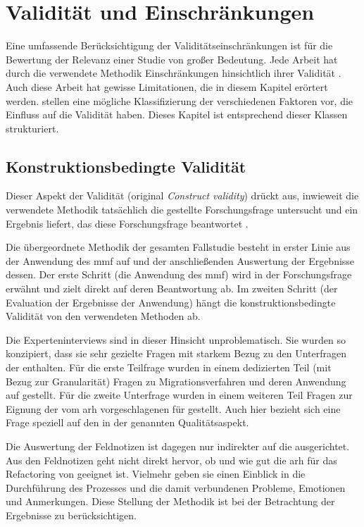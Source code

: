 \chapter{Validität und Einschränkungen}
\label{chap:gueltigkeit}

Eine umfassende Berücksichtigung der Validitätseinschränkungen ist für die Bewertung der Relevanz einer Studie von großer Bedeutung. 
Jede Arbeit hat durch die verwendete Methodik Einschränkungen hinsichtlich ihrer Validität \cite{campbell2015experimental}.
Auch diese Arbeit hat gewisse Limitationen, die in diesem Kapitel erörtert werden.
 stellen eine mögliche Klassifizierung der verschiedenen Faktoren vor, die Einfluss auf die Validität haben.
Dieses Kapitel ist entsprechend dieser Klassen strukturiert.

\section{Konstruktionsbedingte Validität}

Dieser Aspekt der Validität (original \emph{Construct validity}) drückt aus, inwieweit die verwendete Methodik tatsächlich die gestellte Forschungsfrage untersucht und ein Ergebnis liefert, das diese Forschungsfrage beantwortet \cite{Runeson2009}.

Die übergeordnete Methodik der gesamten Fallstudie besteht in erster Linie aus der Anwendung des \gls{mmf} auf \jf und der anschließenden Auswertung der Ergebnisse dessen.
Der erste Schritt (die Anwendung des \gls{mmf}) wird in der Forschungsfrage erwähnt und zielt direkt auf deren Beantwortung ab.
Im zweiten Schritt (der Evaluation der Ergebnisse der Anwendung) hängt die konstruktionsbedingte Validität von den verwendeten Methoden ab.

Die Experteninterviews sind in dieser Hinsicht unproblematisch. 
Sie wurden so konzipiert, dass sie sehr gezielte Fragen mit starkem Bezug zu den Unterfragen der \ff enthalten.
Für die erste Teilfrage wurden in einem dedizierten Teil (mit Bezug zur Granularität) Fragen zu Migrationsverfahren und deren Anwendung auf \jf gestellt.
Für die zweite Unterfrage wurden in einem weiteren Teil Fragen zur Eignung der vom \gls{arh} vorgeschlagenen \bpp für \jf gestellt.
Auch hier bezieht sich eine Frage speziell auf den in der \ff genannten Qualitätsaspekt.

Die Auswertung der Feldnotizen ist dagegen nur indirekter auf die \ff ausgerichtet.
Aus den Feldnotizen geht nicht direkt hervor, ob und wie gut die \gls{arh} für das Refactoring von \jf geeignet ist. 
Vielmehr geben sie einen Einblick in die Durchführung des Prozesses und die damit verbundenen Probleme, Emotionen und Anmerkungen. 
Diese Stellung der Methodik ist bei der Betrachtung der Ergebnisse zu berücksichtigen.

